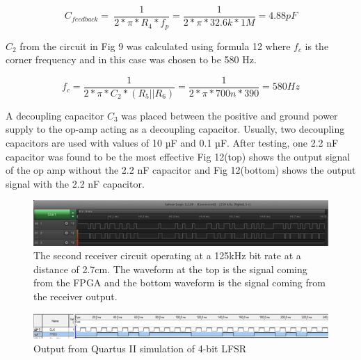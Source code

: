 \documentclass[conference]{IEEEtran}
\begin{document}
\begin{equation}
C_{feedback}=\ \frac{1}{2*\pi{}*R_4*f_p}=\frac{1}{2*\pi{}*32.6k*1M}=4.88pF
\end{equation}

$C_{2}$ from the circuit in Fig 9 was calculated using formula 12 where $f_{c}$ is the corner frequency and in this case was chosen to be 580 Hz. 

\begin{equation}
f_c=\frac{1}{2*\pi{}*C_2*(R_5\vert{}\vert{}R_6)}=\frac{1}{2*\pi{}*700n*390}=580Hz
\end{equation}

A decoupling capacitor $C_{3}$ was placed between the positive and ground power supply to the op-amp acting as a decoupling capacitor. Usually, two decoupling capacitors are used with values of 10 µF and 0.1 µF. After testing, one 2.2 nF capacitor was found to be the most effective Fig 12(top) shows the output signal of the op amp without the 2.2 nF capacitor and Fig 12(bottom) shows the output signal with the 2.2 nF capacitor.

\begin{figure}
\includegraphics[width=\linewidth]{Fig 9.png}\par
\caption{The second receiver circuit operating at a 125kHz bit rate at a distance of 2.7cm. The waveform at the top is the signal coming from the FPGA and the bottom waveform is the signal coming from the receiver output.}
\label{fig}
\end{figure}

\begin{figure}
\includegraphics[width=\linewidth]{Fig 13.png}\par
\caption{Output from Quartus II simulation of 4-bit LFSR}
\label{fig}
\end{figure}
\end{document}
